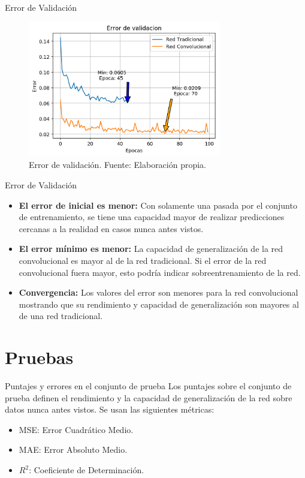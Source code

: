 \documentclass[10pt]{beamer}
\begin{document}
\begin{frame}{Error de Validación}
    \begin{figure}[!ht] 
        \centering
        \includegraphics[width=0.75\textwidth]{../img/valloss}
        \caption[Error de validación]{Error de validación. Fuente: Elaboración propia. }
        \label{fig:valloss}
    \end{figure}
    
\end{frame}


\begin{frame}{Error de Validación}
    \begin{itemize}
        \item \textbf{El error de inicial es menor:} Con solamente una pasada por el conjunto de entrenamiento, se tiene una 
        capacidad mayor de realizar predicciones cercanas a la realidad en casos nunca antes vistos.
        \item \textbf{El error mínimo es menor:} La capacidad de generalización 
        de la red convolucional es mayor al de la red tradicional. Si el error de la red convolucional fuera mayor, esto podría indicar 
        sobreentrenamiento de la red.
        \item \textbf{Convergencia:} Los valores del error son menores para la red convolucional mostrando que su rendimiento 
        y capacidad de generalización son mayores al de una red tradicional.
    \end{itemize}
    
\end{frame}
\section*{Pruebas}
\begin{frame}{Puntajes y errores en el conjunto de prueba}
    Los puntajes sobre el conjunto de prueba definen el rendimiento y la capacidad de generalización de la 
    red sobre datos nunca antes vistos. Se usan las siguientes métricas:

    \begin{itemize}
        \item MSE: Error Cuadrático Medio.
        \item MAE: Error Absoluto Medio.
        \item $R^2$: Coeficiente de Determinación.
    \end{itemize}

\end{frame}
\end{document}

